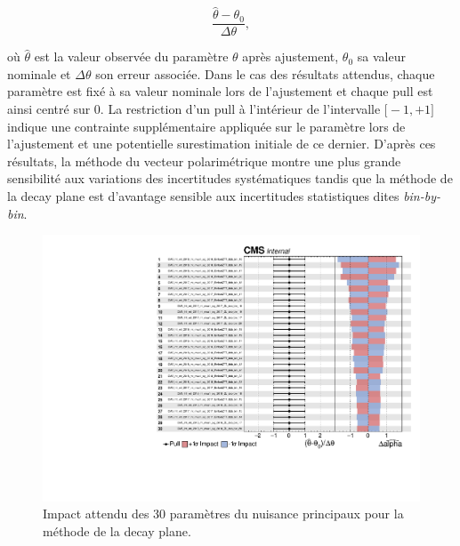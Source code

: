 \begin{equation}
    \frac{\hat{\theta}-\theta_0}{\Delta\theta},
\end{equation}

où $\hat{\theta}$ est la valeur observée du paramètre $\theta$ après ajustement, $\theta_0$ sa valeur nominale et $\Delta\theta$ son erreur associée. Dans le cas des résultats attendus, chaque paramètre est fixé à sa valeur nominale lors de l'ajustement et chaque pull est ainsi centré sur $0$. La restriction d'un pull à l'intérieur de l'intervalle $\bigl[-1,+1\bigr]$ indique une contrainte supplémentaire appliquée sur le paramètre lors de l'ajustement et une potentielle surestimation initiale de ce dernier. D'après ces résultats, la méthode du vecteur polarimétrique montre une plus grande sensibilité aux variations des incertitudes systématiques tandis que la méthode de la decay plane est d'avantage sensible aux incertitudes statistiques dites \textit{bin-by-bin}. \\

\begin{figure}[]
        \centering
        \includegraphics[scale=0.6]{Chapitre7/Images/impactsdpblind.pdf} 
        \vspace{0.5ex}
    \caption{Impact attendu des 30 paramètres du nuisance principaux pour la méthode de la decay plane.}
    \label{expectednuisancepv}
\end{figure}

